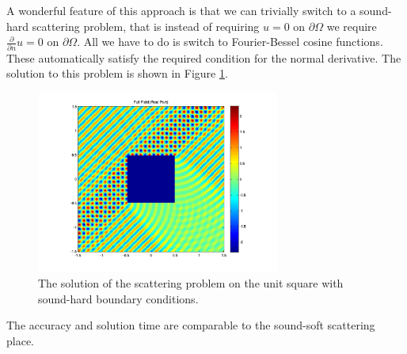 A wonderful feature of this approach is that we can trivially switch
to a sound-hard scattering problem, that is instead of requiring $u=0$
on $\partial\Omega$ we require $\frac{\partial}{\partial n} u=0$ on
$\partial\Omega$. All we have to do is switch to Fourier-Bessel cosine
functions. These automatically satisfy the required condition for the
normal derivative. The solution to this problem is shown in Figure
\ref{fig:squareplot2}.
\begin{figure}
\center
\includegraphics[width=8cm]{squareplot2}
\caption{The solution of the scattering problem on the unit
  square with sound-hard boundary conditions.}
\label{fig:squareplot2}
\end{figure}
The accuracy and solution time are comparable to the sound-soft
scattering place.

